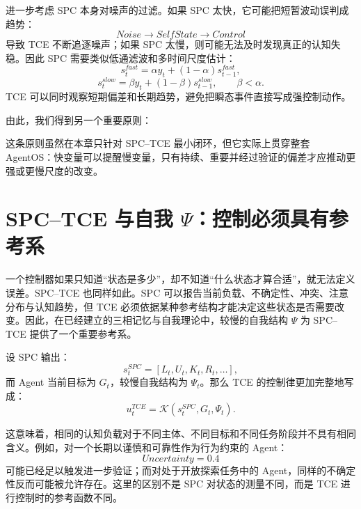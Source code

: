 进一步考虑 SPC 本身对噪声的过滤。如果 SPC 太快，它可能把短暂波动误判成趋势：
\begin{equation}
Noise
\rightarrow
SelfState
\rightarrow
Control
\end{equation}
导致 TCE 不断追逐噪声；如果 SPC 太慢，则可能无法及时发现真正的认知失稳。因此 SPC 需要类似低通滤波和多时间尺度估计：
\begin{equation}
s_t^{fast}
=
\alpha y_t+(1-\alpha)s_{t-1}^{fast},
\end{equation}
\begin{equation}
s_t^{slow}
=
\beta y_t+(1-\beta)s_{t-1}^{slow},
\qquad
\beta<\alpha.
\end{equation}
TCE 可以同时观察短期偏差和长期趋势，避免把瞬态事件直接写成强控制动作。

由此，我们得到另一个重要原则：
\begin{statementbox}
\centering
{}
\end{statementbox}

这条原则虽然在本章只针对 SPC--TCE 最小闭环，但它实际上贯穿整套 AgentOS：快变量可以提醒慢变量，只有持续、重要并经过验证的偏差才应推动更强或更慢尺度的改变。

\section{SPC--TCE 与自我 $\Psi$：控制必须具有参考系}

一个控制器如果只知道``状态是多少''，却不知道``什么状态才算合适''，就无法定义误差。SPC--TCE 也同样如此。SPC 可以报告当前负载、不确定性、冲突、注意分布与认知趋势，但 TCE 必须依据某种参考结构才能决定这些状态是否需要改变。因此，在已经建立的三相记忆与自我理论中，较慢的自我结构 $\Psi$ 为 SPC--TCE 提供了一个重要参考系。

设 SPC 输出：
\begin{equation}
s_t^{SPC}
=
[
L_t,U_t,K_t,R_t,\ldots
],
\end{equation}
而 Agent 当前目标为 $G_t$，较慢自我结构为 $\Psi_t$。那么 TCE 的控制律更加完整地写成：
\begin{equation}
u_t^{TCE}
=
\mathcal K
\left(
s_t^{SPC},
G_t,
\Psi_t
\right).
\label{eq:tce-with-self}
\end{equation}

这意味着，相同的认知负载对于不同主体、不同目标和不同任务阶段并不具有相同含义。例如，对一个长期以谨慎和可靠性作为行为约束的 Agent：
\begin{equation}
Uncertainty=0.4
\end{equation}
可能已经足以触发进一步验证；而对处于开放探索任务中的 Agent，同样的不确定性反而可能被允许存在。这里的区别不是 SPC 对状态的测量不同，而是 TCE 进行控制时的参考函数不同。

